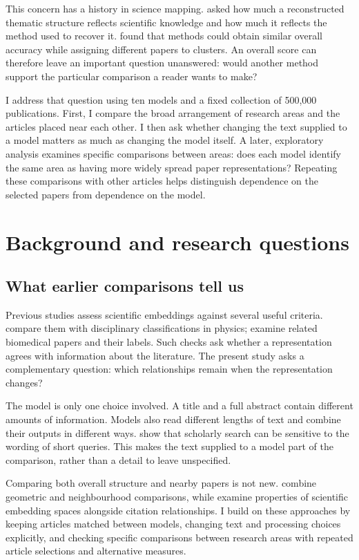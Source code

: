 This concern has a history in science mapping. \citet{refa0d2d707e6} asked how much a reconstructed thematic structure reflects scientific knowledge and how much it reflects the method used to recover it. \citet{ref6a2f5912bc} found that methods could obtain similar overall accuracy while assigning different papers to clusters. An overall score can therefore leave an important question unanswered: would another method support the particular comparison a reader wants to make?

I address that question using ten models and a fixed collection of 500,000 publications. First, I compare the broad arrangement of research areas and the articles placed near each other. I then ask whether changing the text supplied to a model matters as much as changing the model itself. A later, exploratory analysis examines specific comparisons between areas: does each model identify the same area as having more widely spread paper representations? Repeating these comparisons with other articles helps distinguish dependence on the selected papers from dependence on the model.

\section{Background and research questions}
\subsection{What earlier comparisons tell us}
Previous studies assess scientific embeddings against several useful criteria. \citet{refc0e2cc29e0} compare them with disciplinary classifications in physics; \citet{refbe130e2973} examine related biomedical papers and their labels. Such checks ask whether a representation agrees with information about the literature. The present study asks a complementary question: which relationships remain when the representation changes?

The model is only one choice involved. A title and a full abstract contain different amounts of information. Models also read different lengths of text and combine their outputs in different ways. \citet{singh-singh-2022-inefficiency} show that scholarly search can be sensitive to the wording of short queries. This makes the text supplied to a model part of the comparison, rather than a detail to leave unspecified.

Comparing both overall structure and nearby papers is not new. \citet{ref4e1e0d5582} combine geometric and neighbourhood comparisons, while \citet{ref6da178065c} examine properties of scientific embedding spaces alongside citation relationships. I build on these approaches by keeping articles matched between models, changing text and processing choices explicitly, and checking specific comparisons between research areas with repeated article selections and alternative measures.

